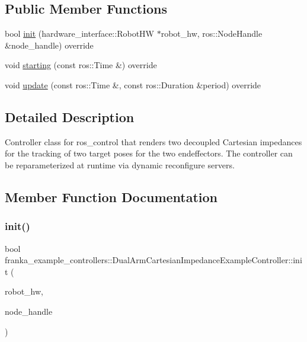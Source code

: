 \subsection*{Public Member Functions}
\begin{DoxyCompactItemize}
\item 
bool \hyperlink{classfranka__example__controllers_1_1_dual_arm_cartesian_impedance_example_controller_a08aa5d3bd14a872c17a89cb8b99b8a29}{init} (hardware\+\_\+interface\+::\+Robot\+HW $\ast$robot\+\_\+hw, ros\+::\+Node\+Handle \&node\+\_\+handle) override
\item 
void \hyperlink{classfranka__example__controllers_1_1_dual_arm_cartesian_impedance_example_controller_a5c2a6cdbdb2d235b13f9d791755aaf54}{starting} (const ros\+::\+Time \&) override
\item 
void \hyperlink{classfranka__example__controllers_1_1_dual_arm_cartesian_impedance_example_controller_af218e8bcee9aa11c5824eb2bdee2638e}{update} (const ros\+::\+Time \&, const ros\+::\+Duration \&period) override
\end{DoxyCompactItemize}


\subsection{Detailed Description}
Controller class for ros\+\_\+control that renders two decoupled Cartesian impedances for the tracking of two target poses for the two endeffectors. The controller can be reparameterized at runtime via dynamic reconfigure servers. 

\subsection{Member Function Documentation}
\mbox{\label{classfranka__example__controllers_1_1_dual_arm_cartesian_impedance_example_controller_a08aa5d3bd14a872c17a89cb8b99b8a29}} 
\subsubsection{\texorpdfstring{init()}{init()}}
{\footnotesize\ttfamily bool franka\+\_\+example\+\_\+controllers\+::\+Dual\+Arm\+Cartesian\+Impedance\+Example\+Controller\+::init (\begin{DoxyParamCaption}\item[{hardware\+\_\+interface\+::\+Robot\+HW $\ast$}]{robot\+\_\+hw,  }\item[{ros\+::\+Node\+Handle \&}]{node\+\_\+handle }\end{DoxyParamCaption})\hspace{0.3cm}{\ttfamily [override]}}

